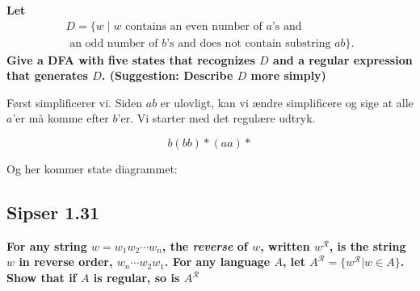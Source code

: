 \textbf{Let}
\begin{align*}
  D = \{w\; | \; w \text{ contains an even number of } a \text{'s and}\\ \text{ an odd number of }b \text{'s and does not contain substring }ab\}.
\end{align*}
\textbf{Give a DFA with five states that recognizes $D$ and a regular expression that generates $D$. (Suggestion: Describe $D$ more simply)}

Først simplificerer vi. Siden $ab$ er ulovligt, kan vi ændre simplificere og sige at alle $a$'er må komme efter $b$'er.
Vi starter med det regulære udtryk.

\begin{equation*}
b(bb)*(aa)*
\end{equation*}

Og her kommer state diagrammet:

\begin{center}
\end{center}

\subsection{Sipser 1.31}%
\label{subsec:sipser1.31}

\textbf{For any string $w = w_{1}w_{2} \cdots w_{n}$, the \textit{reverse} of $w$, written $w^{\mathcal{R}}$, is the string $w$ in reverse order, $w_{n} \cdots w_{2}w_{1}$. For any language $A$, let $A^{\mathcal{R}} = \{w^{\mathcal{R}} | w \in A\}$. Show that if $A$ is regular, so is $A^{\mathcal{R}}$}

